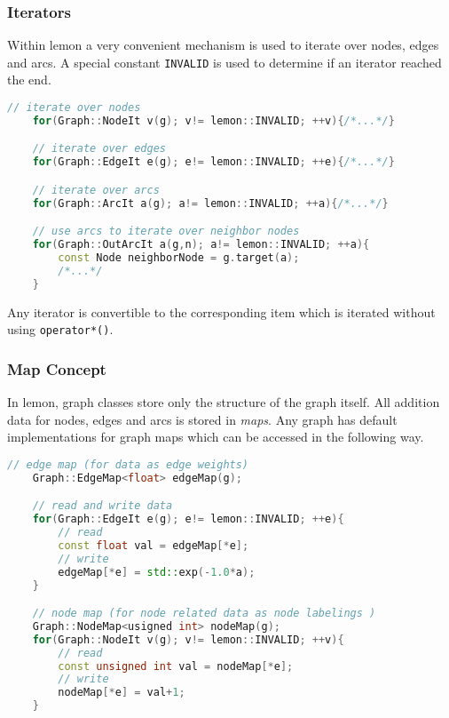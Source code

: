 \subsubsection{Iterators}

    Within lemon a very convenient mechanism is used to iterate over
    nodes, edges and arcs.
    A special constant \lstinline{INVALID} is used to determine if 
    an iterator reached the end.

    \begin{minipage}{\textwidth}\vspace{-0.75cm}\begin{lstlisting}[language=c++]
    // iterate over nodes
    for(Graph::NodeIt v(g); v!= lemon::INVALID; ++v){/*...*/}

    // iterate over edges
    for(Graph::EdgeIt e(g); e!= lemon::INVALID; ++e){/*...*/}

    // iterate over arcs
    for(Graph::ArcIt a(g); a!= lemon::INVALID; ++a){/*...*/}

    // use arcs to iterate over neighbor nodes
    for(Graph::OutArcIt a(g,n); a!= lemon::INVALID; ++a){
        const Node neighborNode = g.target(a);
        /*...*/
    }
    \end{lstlisting}\end{minipage}\vspace{0.5cm}

    Any iterator is convertible to the corresponding item which
    is iterated without using \lstinline{operator*()}.

\subsubsection{Map Concept}

    In lemon, graph classes store only the structure of the graph itself.
    All addition data for nodes, edges and arcs is stored 
    in \emph{maps}. 
    Any graph has default implementations for graph maps which
    can be accessed in the following way.

    \begin{minipage}{\textwidth}\vspace{-0.75cm}\begin{lstlisting}[language=c++]
    // edge map (for data as edge weights)
    Graph::EdgeMap<float> edgeMap(g); 

    // read and write data 
    for(Graph::EdgeIt e(g); e!= lemon::INVALID; ++e){
        // read
        const float val = edgeMap[*e];
        // write
        edgeMap[*e] = std::exp(-1.0*a);
    }

    // node map (for node related data as node labelings )
    Graph::NodeMap<usigned int> nodeMap(g);
    for(Graph::NodeIt v(g); v!= lemon::INVALID; ++v){
        // read
        const unsigned int val = nodeMap[*e];
        // write
        nodeMap[*e] = val+1;
    }
    \end{lstlisting}\end{minipage}\vspace{0.5cm}


